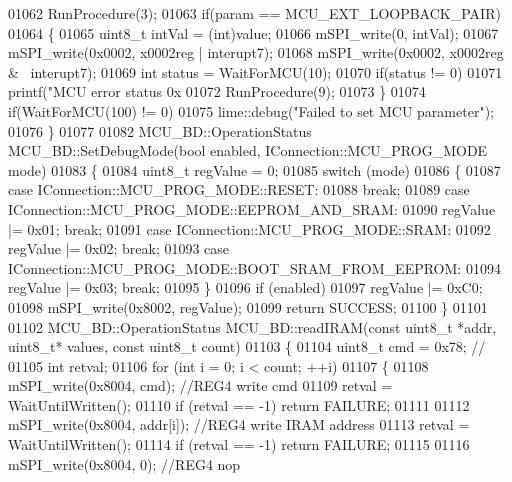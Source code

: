 \begin{DoxyCode}
{{{{{{{01062         RunProcedure(3);
01063     \textcolor{keywordflow}{if}(param == MCU_EXT_LOOPBACK_PAIR)
01064     \{
01065         uint8\_t intVal = (int)value;
01066         mSPI\_write(0, intVal);
01067         mSPI\_write(0x0002, x0002reg | interupt7);
01068         mSPI\_write(0x0002, x0002reg & ~interupt7);
01069         \textcolor{keywordtype}{int} status = WaitForMCU(10);
01070         \textcolor{keywordflow}{if}(status != 0)
01071             printf(\textcolor{stringliteral}{"MCU error status 0x%
01072         RunProcedure(9);
01073     \}
01074     \textcolor{keywordflow}{if}(WaitForMCU(100) != 0)
01075         lime::debug(\textcolor{stringliteral}{"Failed to set MCU parameter"});
01076 \}
01077 
01082 MCU_BD::OperationStatus MCU\_BD::SetDebugMode(\textcolor{keywordtype}{bool} enabled, 
      IConnection::MCU_PROG_MODE mode)
01083 \{
01084     uint8\_t regValue = 0;
01085     \textcolor{keywordflow}{switch} (mode)
01086     \{
01087     \textcolor{keywordflow}{case} IConnection::MCU\_PROG\_MODE::RESET:
01088         \textcolor{keywordflow}{break};
01089     \textcolor{keywordflow}{case} IConnection::MCU\_PROG\_MODE::EEPROM\_AND\_SRAM:
01090         regValue |= 0x01; \textcolor{keywordflow}{break};
01091     \textcolor{keywordflow}{case} IConnection::MCU\_PROG\_MODE::SRAM:
01092         regValue |= 0x02; \textcolor{keywordflow}{break};
01093     \textcolor{keywordflow}{case} IConnection::MCU\_PROG\_MODE::BOOT\_SRAM\_FROM\_EEPROM:
01094         regValue |= 0x03; \textcolor{keywordflow}{break};
01095     \}
01096     \textcolor{keywordflow}{if} (enabled)
01097         regValue |= 0xC0;
01098     mSPI\_write(0x8002, regValue);
01099     \textcolor{keywordflow}{return} SUCCESS;
01100 \}
01101 
01102 MCU_BD::OperationStatus MCU\_BD::readIRAM(\textcolor{keyword}{const} uint8\_t *addr, uint8\_t* values, \textcolor{keyword}{const} uint8\_t 
      count)
01103 \{
01104     uint8\_t cmd = 0x78; \textcolor{comment}{//}
01105     \textcolor{keywordtype}{int} retval;
01106     \textcolor{keywordflow}{for} (\textcolor{keywordtype}{int} i = 0; i < count; ++i)
01107     \{
01108         mSPI\_write(0x8004, cmd); \textcolor{comment}{//REG4 write cmd}
01109         retval = WaitUntilWritten();
01110         \textcolor{keywordflow}{if} (retval == -1) \textcolor{keywordflow}{return} FAILURE;
01111 
01112         mSPI\_write(0x8004, addr[i]); \textcolor{comment}{//REG4 write IRAM address}
01113         retval = WaitUntilWritten();
01114         \textcolor{keywordflow}{if} (retval == -1) \textcolor{keywordflow}{return} FAILURE;
01115 
01116         mSPI\_write(0x8004, 0); \textcolor{comment}{//REG4 nop}
}}}}}}}}
\end{DoxyCode}
